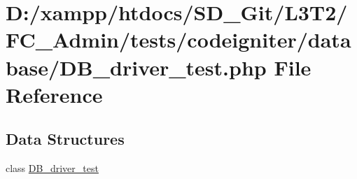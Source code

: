 \hypertarget{_admin_2tests_2codeigniter_2database_2_d_b__driver__test_8php}{}\section{D\+:/xampp/htdocs/\+S\+D\+\_\+\+Git/\+L3\+T2/\+F\+C\+\_\+\+Admin/tests/codeigniter/database/\+D\+B\+\_\+driver\+\_\+test.php File Reference}
\label{_admin_2tests_2codeigniter_2database_2_d_b__driver__test_8php}
\subsection*{Data Structures}
\begin{DoxyCompactItemize}
\item 
class \hyperlink{class_d_b__driver__test}{D\+B\+\_\+driver\+\_\+test}
\end{DoxyCompactItemize}
